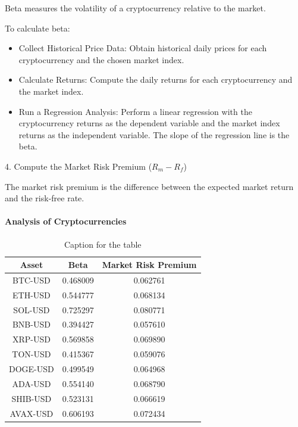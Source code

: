 \documentclass{ledger}
\begin{document}
Beta measures the volatility of a cryptocurrency relative to the market. 

To calculate beta:

\begin{itemize}
    \item Collect Historical Price Data: Obtain historical daily prices for each cryptocurrency and the chosen market index.
    \item Calculate Returns: Compute the daily returns for each cryptocurrency and the market index.
    \item Run a Regression Analysis: Perform a linear regression with the cryptocurrency returns as the dependent variable and the market index returns as the independent variable. The slope of the regression line is the beta.
\end{itemize}

4. Compute the Market Risk Premium (\(R_m - R_f\))

The market risk premium is the difference between the expected market return and the risk-free rate.

\paragraph{Analysis of Cryptocurrencies}

\begin{table}[h]
    \centering
    \begin{tabular}{ccc}
         \textbf{Asset} & \textbf{Beta} & \textbf{Market Risk Premium} \\
         \hline
         BTC-USD & 0.468009 & 0.062761 \\
         ETH-USD & 0.544777 & 0.068134 \\
         SOL-USD & 0.725297 & 0.080771 \\
         BNB-USD & 0.394427 & 0.057610 \\
         XRP-USD & 0.569858 & 0.069890 \\
         TON-USD & 0.415367 & 0.059076 \\
         DOGE-USD & 0.499549 & 0.064968 \\
         ADA-USD & 0.554140 & 0.068790 \\
         SHIB-USD & 0.523131 & 0.066619 \\
         AVAX-USD & 0.606193 & 0.072434 \\
    \end{tabular}
    \caption{Caption for the table}
    \label{tab:my_label}
\end{table}
\end{document}
